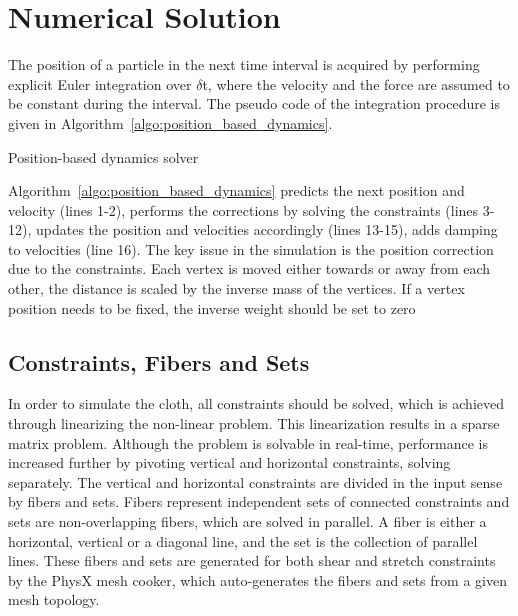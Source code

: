 \section{Numerical Solution}
\label{section_numerical_solution}
The position of a particle in the next time interval is acquired by performing explicit Euler integration over $\delta$t, where the velocity and the force are assumed to be constant during the interval. The pseudo code of the integration procedure is given in Algorithm~\ref{algo:position_based_dynamics}.

\begin{algorithm}[ht]
\DontPrintSemicolon %
\caption{Position-based dynamics solver}
\label{algo:position_based_dynamics}
\end{algorithm}

Algorithm~\ref{algo:position_based_dynamics} predicts the next position and velocity (lines 1-2), performs the corrections by solving the constraints (lines 3-12), updates the position and velocities accordingly (lines 13-15), adds damping to velocities (line 16). The key issue in the simulation is the position correction due to the constraints. Each vertex is moved either towards or away from each other, the distance is scaled by the inverse mass of the vertices. If a vertex position needs to be fixed, the inverse weight should be set to zero

\subsection{Constraints, Fibers and Sets}
In order to simulate the cloth, all constraints should be solved, which is achieved through linearizing the non-linear problem. This linearization results in a sparse matrix problem. Although the problem is solvable in real-time, performance is increased further by pivoting vertical and horizontal constraints, solving separately. The vertical and horizontal constraints are divided in the input sense by fibers and sets. Fibers represent independent sets of connected constraints and sets are non-overlapping fibers, which are solved in parallel. A fiber is either a horizontal, vertical or a diagonal line, and the set is the collection of parallel lines. These fibers and sets are generated for both shear and stretch constraints by the PhysX mesh cooker, which auto-generates the fibers and sets from a given mesh topology. 

